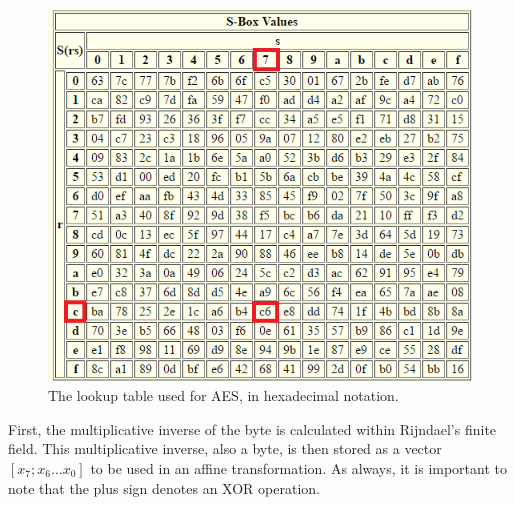 \documentclass[12pt]{report}
\begin{document}
\begin{figure}[H]
\centering
\includegraphics[scale=1]{SBox.PNG}
\caption{The lookup table used for AES, in hexadecimal notation\cite{SBox}.}
\end{figure}

First, the multiplicative inverse of the byte is calculated within Rijndael's finite field. This multiplicative inverse, also a byte, is then stored as a vector $[x_7; x_6 ... x_0]$ to be used in an affine transformation. As always, it is important to note that the plus sign denotes an XOR operation.
\end{document}
